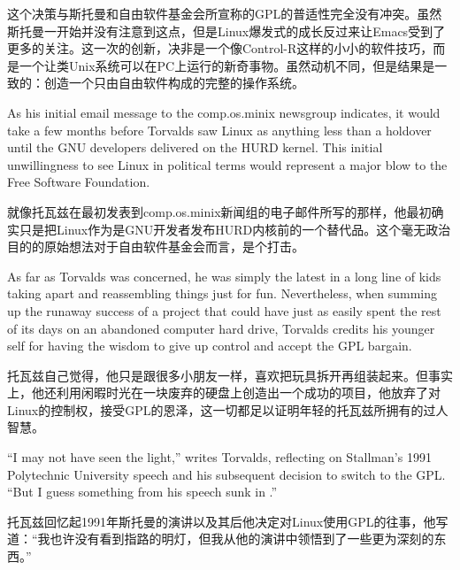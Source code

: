 \ifdefined\chs
这个决策与斯托曼和自由软件基金会所宣称的GPL的普适性完全没有冲突。虽然斯托曼一开始并没有注意到这点，但是Linux爆发式的成长反过来让Emacs受到了更多的关注。这一次的创新，决非是一个像Control-R这样的小小的软件技巧，而是一个让类Unix系统可以在PC上运行的新奇事物。虽然动机不同，但是结果是一致的：创造一个只由自由软件构成的完整的操作系统。
\fi

\ifdefined\eng
As his initial email message to the comp.os.minix newsgroup indicates, it would take a few months before Torvalds saw Linux as anything less than a holdover until the GNU developers delivered on the HURD kernel. This initial unwillingness to see Linux in political terms would represent a major blow to the Free Software Foundation.
\fi

\ifdefined\chs
就像托瓦兹在最初发表到comp.os.minix新闻组的电子邮件所写的那样，他最初确实只是把Linux作为是GNU开发者发布HURD内核前的一个替代品。这个毫无政治目的的原始想法对于自由软件基金会而言，是个打击。
\fi

\ifdefined\eng
As far as Torvalds was concerned, he was simply the latest in a long line of kids taking apart and reassembling things just for fun. Nevertheless, when summing up the runaway success of a project that could have just as easily spent the rest of its days on an abandoned computer hard drive, Torvalds credits his younger self for having the wisdom to give up control and accept the GPL bargain.
\fi

\ifdefined\chs
托瓦兹自己觉得，他只是跟很多小朋友一样，喜欢把玩具拆开再组装起来。但事实上，他还利用闲暇时光在一块废弃的硬盘上创造出一个成功的项目，他放弃了对Linux的控制权，接受GPL的恩泽，这一切都足以证明年轻的托瓦兹所拥有的过人智慧。
\fi

\ifdefined\eng
``I may not have seen the light,'' writes Torvalds, reflecting on Stallman's 1991 Polytechnic University speech and his subsequent decision to switch to the GPL. ``But I guess something from his speech sunk in .''
\fi

\ifdefined\chs
托瓦兹回忆起1991年斯托曼的演讲以及其后他决定对Linux使用GPL的往事，他写道：``我也许没有看到指路的明灯，但我从他的演讲中领悟到了一些更为深刻的东西。''
\fi

\theendnotes
\setcounter{endnote}{0}


